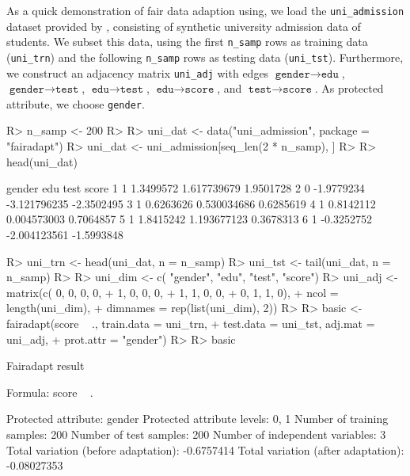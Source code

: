 \documentclass[
  nojss]{jss}
\begin{document}
As a quick demonstration of fair data adaption using, we load the
\texttt{uni\_admission} dataset provided by , consisting
of synthetic university admission data of students. We subset this data,
using the first \texttt{n\_samp} rows as training data
(\texttt{uni\_trn}) and the following \texttt{n\_samp} rows as testing
data (\texttt{uni\_tst}). Furthermore, we construct an adjacency matrix
\texttt{uni\_adj} with edges \(\texttt{gender} \to \texttt{edu}\),
\(\texttt{gender} \to \texttt{test}\),
\(\texttt{edu} \to \texttt{test}\), \(\texttt{edu} \to \texttt{score}\),
and \(\texttt{test} \to \texttt{score}\). As protected attribute, we
choose \texttt{gender}.

\begin{CodeChunk}
\begin{CodeInput}
R> n_samp <- 200
R> 
R> uni_dat <- data("uni_admission", package = "fairadapt")
R> uni_dat <- uni_admission[seq_len(2 * n_samp), ]
R> 
R> head(uni_dat)
\end{CodeInput}
\begin{CodeOutput}
  gender        edu         test      score
1      1  1.3499572  1.617739679  1.9501728
2      0 -1.9779234 -3.121796235 -2.3502495
3      1  0.6263626  0.530034686  0.6285619
4      1  0.8142112  0.004573003  0.7064857
5      1  1.8415242  1.193677123  0.3678313
6      1 -0.3252752 -2.004123561 -1.5993848
\end{CodeOutput}
\begin{CodeInput}
R> uni_trn <- head(uni_dat, n = n_samp)
R> uni_tst <- tail(uni_dat, n = n_samp)
R> 
R> uni_dim <- c(       "gender", "edu", "test", "score")
R> uni_adj <- matrix(c(       0,     0,      0,       0,
+                             1,     0,      0,       0,
+                             1,     1,      0,       0,
+                             0,     1,      1,       0),
+                   ncol = length(uni_dim),
+                   dimnames = rep(list(uni_dim), 2))
R> 
R> basic <- fairadapt(score ~ ., train.data = uni_trn,
+                     test.data = uni_tst, adj.mat = uni_adj,
+                     prot.attr = "gender")
R> 
R> basic
\end{CodeInput}
\begin{CodeOutput}
Fairadapt result

Formula:
 score ~ . 

Protected attribute:                  gender 
Protected attribute levels:           0, 1 
Number of training samples:           200 
Number of test samples:               200 
Number of independent variables:      3 
Total variation (before adaptation):  -0.6757414 
Total variation (after adaptation):   -0.08027353 
\end{CodeOutput}
\end{CodeChunk}
\end{document}
